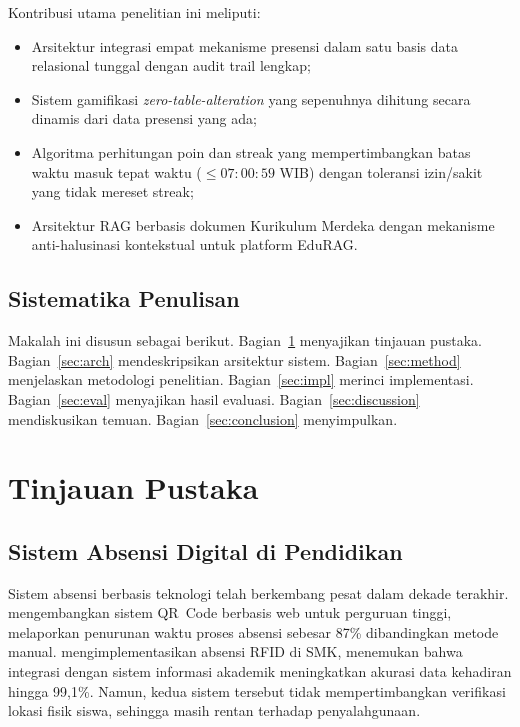 \documentclass[12pt,a4paper]{article}
\newcommand{\edurag}{EduRAG}
\begin{document}
Kontribusi utama penelitian ini meliputi:
\begin{itemize}
  \item Arsitektur integrasi empat mekanisme presensi dalam satu basis
        data relasional tunggal dengan audit trail lengkap;
  \item Sistem gamifikasi \textit{zero-table-alteration} yang sepenuhnya
        dihitung secara dinamis dari data presensi yang ada;
  \item Algoritma perhitungan poin dan streak yang mempertimbangkan batas
        waktu masuk tepat waktu ($\leq 07:00:59$ WIB) dengan toleransi
        izin/sakit yang tidak mereset streak;
  \item Arsitektur RAG berbasis dokumen Kurikulum Merdeka dengan
        mekanisme anti-halusinasi kontekstual untuk platform \edurag{}.
\end{itemize}

\subsection{Sistematika Penulisan}

Makalah ini disusun sebagai berikut.
Bagian~\ref{sec:review} menyajikan tinjauan pustaka.
Bagian~\ref{sec:arch} mendeskripsikan arsitektur sistem.
Bagian~\ref{sec:method} menjelaskan metodologi penelitian.
Bagian~\ref{sec:impl} merinci implementasi.
Bagian~\ref{sec:eval} menyajikan hasil evaluasi.
Bagian~\ref{sec:discussion} mendiskusikan temuan.
Bagian~\ref{sec:conclusion} menyimpulkan.

\section{Tinjauan Pustaka}
\label{sec:review}

\subsection{Sistem Absensi Digital di Pendidikan}

Sistem absensi berbasis teknologi telah berkembang pesat dalam dekade
terakhir. \citet{wisnumurti2022qr} mengembangkan sistem QR~Code berbasis
web untuk perguruan tinggi, melaporkan penurunan waktu proses absensi
sebesar 87\% dibandingkan metode manual.
\citet{kurniawan2023absensi} mengimplementasikan absensi RFID
di SMK, menemukan bahwa integrasi dengan sistem informasi akademik
meningkatkan akurasi data kehadiran hingga 99,1\%.
Namun, kedua sistem tersebut tidak mempertimbangkan verifikasi lokasi
fisik siswa, sehingga masih rentan terhadap penyalahgunaan.
\end{document}
